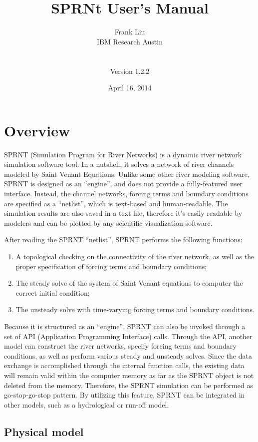 \documentclass[10pt, letterpaper]{article}
\title{SPRNt User's Manual}
\author{
Frank Liu\\
IBM Research Austin\\
\\
\\
Version 1.2.2
\date{April 16, 2014}
}
\begin{document}
\maketitle

\section{Overview}
\label{sec:overview}
SPRNT (Simulation Program for River Networks) is a dynamic river network simulation
software tool. In a nutshell, it solves a network of river channels modeled by Saint
Venant Equations. Unlike some other river modeling software, SPRNT is designed as an
``engine'', and does not provide a fully-featured user interface.  Instead, the channel
networks, forcing terms and boundary conditions are specified as a ``netlist'', which is
text-based and human-readable. The simulation results are also saved in a text file,
therefore it's easily readable by modelers and can be plotted by any scientific
visualization software.

After reading the SPRNT ``netlist'', SPRNT performs the following functions:
\begin{enumerate}
\item{A topological checking on the connectivity of the river network, as well as the
  proper specification of forcing terms and boundary conditions;}
\item{The steady solve of the system of Saint Venant equations to computer the
  correct initial condition;}
\item{The unsteady solve with time-varying forcing terms and boundary conditions.}
\end{enumerate}

Because it is structured as an ``engine'', SPRNT can also be invoked through a set of API
(Application Programming Interface) calls. Through the API, another model can construct
the river networks, specify forcing terms and boundary conditions, as well as perform
various steady and unsteady solves. Since the data exchange is accomplished through the
internal function calls, the existing data will remain valid within the computer memory as
far as the SPRNT object is not deleted from the memory. Therefore, the SPRNT simulation
can be performed as go-stop-go-stop pattern. By utilizing this feature, SPRNT can be
integrated in other models, such as a hydrological or run-off model.


\subsection{Physical model}
\end{document}
